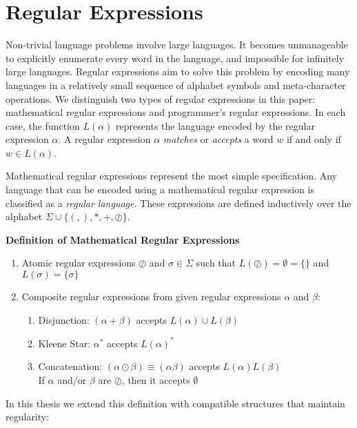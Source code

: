 \section{Regular Expressions}
\label{sec:Regular Expressions}
Non-trivial language problems involve large languages. It becomes unmanageable to explicitly enumerate every word in the language, and impossible for infinitely large languages. Regular expressions aim to solve this problem by encoding many languages in a relatively small sequence of alphabet symbols and meta-character operations. We distinguish two types of regular expressions in this paper: mathematical regular expressions and programmer's regular expressions. In each case, the function $L(\alpha)$ represents the language encoded by the regular expression $\alpha$. A regular expression $\alpha$ \emph{matches} or \emph{accepts} a word $w$ if and only if $w \in L(\alpha)$.

Mathematical regular expressions represent the most simple specification. Any language that can be encoded using a mathematical regular expression is classified as a \emph{regular language}. These expressions are defined inductively over the alphabet $\Sigma \cup \{(, ), *, +, \oslash\}$. 

{\bf Definition of Mathematical Regular Expressions}
\begin{enumerate}
  \item Atomic regular expressions $\oslash$ and $\sigma \in \Sigma$ such that $L(\oslash) = \emptyset = \{\}$ and $L(\sigma) = \{\sigma\}$
  \item Composite regular expressions from given regular expressions $\alpha$ and $\beta$:
    \begin{enumerate}
      \item Disjunction: $(\alpha + \beta)$ accepts $L(\alpha) \cup L(\beta)$
      \item Kleene Star: $\alpha^*$ accepts $L(\alpha)^*$
      \item Concatenation: $(\alpha \odot \beta) \equiv (\alpha \beta)$ accepts $L(\alpha) L(\beta)$ \\
            If $\alpha$ and/or $\beta$ are $\oslash$, then it accepts $\emptyset$
    \end{enumerate}
\end{enumerate}
In this thesis we extend this definition with compatible structures that maintain regularity:

